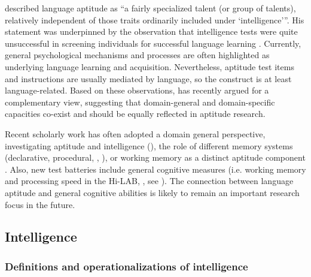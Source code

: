 \documentclass[output=paper]{langscibook}
\begin{document}
\citet[89]{Carroll1964} described language aptitude as “a fairly specialized talent (or group of talents), relatively independent of those traits ordinarily included under ‘intelligence’”. His statement was underpinned by the observation that intelligence tests were quite unsuccessful in screening individuals for successful language learning \citep{Carroll1964}. Currently, general psychological mechanisms and processes are often highlighted as underlying language learning and acquisition. Nevertheless, aptitude test items and instructions are usually mediated by language, so the construct is at least language-related. Based on these observations, \citet{Skehan2019} has recently argued for a complementary view, suggesting that domain-general and domain-specific capacities co-exist and should be equally reflected in aptitude research. 

Recent scholarly work has often adopted a domain general perspective, investigating aptitude and intelligence (\citealt{Granena2012,Granena2013}), the role of different memory systems (declarative, procedural, \citealt{Carpenter2008}, \citealt{MorganShortEtAl2014}), or working memory as a distinct aptitude component \citep{Wen2019}. Also, new test batteries include general cognitive measures (i.e. working memory and processing speed in the Hi-LAB, \citealt{LinckEtAl2013}, see ). The connection between language aptitude and general cognitive abilities is likely to remain an important research focus in the future.

\subsection{Intelligence} %

\subsubsection{Definitions and operationalizations of intelligence} %
\end{document}
